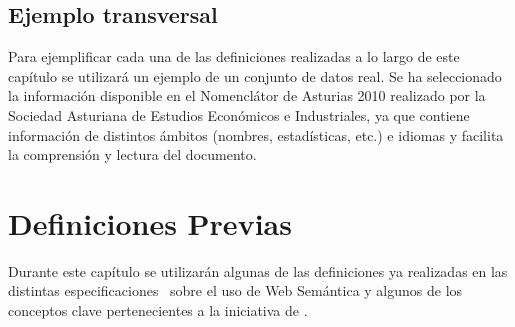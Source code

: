 \subsection{Ejemplo transversal}
Para ejemplificar cada una de las definiciones realizadas a lo largo de este capítulo se utilizará
un ejemplo de un conjunto de datos real. Se ha seleccionado la información disponible en el Nomenclátor
de Asturias 2010 realizado por la Sociedad Asturiana de Estudios Económicos e Industriales, ya que contiene
información de distintos ámbitos (nombres, estadísticas, etc.) e idiomas y facilita la comprensión y lectura del documento. 

\section{Definiciones Previas}
Durante este capítulo se utilizarán algunas de las definiciones ya realizadas
en las distintas especificaciones~\cite{RDF,citeulike:1556975,RDFS,owl2-primer,SparqlSemantics,Perez:2009:SCS:1567274.1567278} sobre el uso de Web Semántica y algunos
de los conceptos clave pertenecientes a la iniciativa de \linkeddata. 

